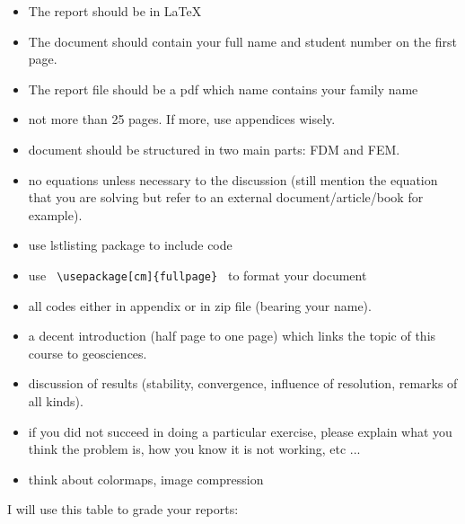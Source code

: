 \begin{itemize}
\item The report should be in \LaTeX 
\item The document should contain your full name and student number on the first page. 
\item The report file should be a pdf which name contains your family name
\item not more than 25 pages. If more, use appendices wisely.
\item document should be structured in two main parts: FDM and FEM.
\item no equations unless necessary to the discussion (still mention the equation that 
you are solving but refer to an external document/article/book for example).
\item use lstlisting package to include code
\item use {\verb| \usepackage[cm]{fullpage} |} to format your document
\item all codes either in appendix or in zip file (bearing your name).
\item a decent introduction (half page to one page) which links the topic of this course to geosciences.
\item discussion of results (stability, convergence, influence of resolution, remarks of all kinds).
\item if you did not succeed in doing a particular exercise, please explain what you think the problem is, 
how you know it is not working, etc ...
\item think about colormaps, image compression
\end{itemize}


I will use this table to grade your reports:

\vspace{2cm}


